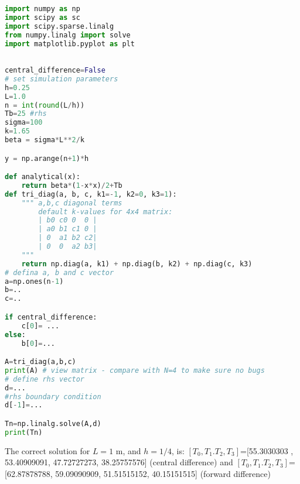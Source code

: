 \documentclass[graybox,sectrefs,envcountresetchap,open=right,final]{svmonodo}
\newenvironment{doconceexercise}{}{}
\begin{document}
\begin{doconceexercise}
\noindent






\begin{lstlisting}[language=python,style=blue1]
import numpy as np
import scipy as sc
import scipy.sparse.linalg
from numpy.linalg import solve
import matplotlib.pyplot as plt

\end{lstlisting}














































\begin{lstlisting}[language=python,style=blue1]

central_difference=False
# set simulation parameters
h=0.25
L=1.0
n = int(round(L/h))
Tb=25 #rhs
sigma=100
k=1.65 
beta = sigma*L**2/k

y = np.arange(n+1)*h

def analytical(x):
    return beta*(1-x*x)/2+Tb
def tri_diag(a, b, c, k1=-1, k2=0, k3=1):
    """ a,b,c diagonal terms
        default k-values for 4x4 matrix:
        | b0 c0 0  0 |
        | a0 b1 c1 0 |
        | 0  a1 b2 c2|
        | 0  0  a2 b3|
    """
    return np.diag(a, k1) + np.diag(b, k2) + np.diag(c, k3)
# defina a, b and c vector
a=np.ones(n-1)
b=..
c=..

if central_difference:
    c[0]= ...
else:
    b[0]=...

A=tri_diag(a,b,c)
print(A) # view matrix - compare with N=4 to make sure no bugs
# define rhs vector
d=...
#rhs boundary condition
d[-1]=...

Tn=np.linalg.solve(A,d)
print(Tn)

\end{lstlisting}

The correct solution for $L=1$ m, and $h=1/4$, is: $[T_0,T_1.T_2,T_3]$=[55.3030303 , 53.40909091, 47.72727273, 38.25757576] (central difference) and $[T_0,T_1.T_2,T_3]$=[62.87878788, 59.09090909, 51.51515152, 40.15151515] (forward difference)

\end{doconceexercise}
\end{document}
